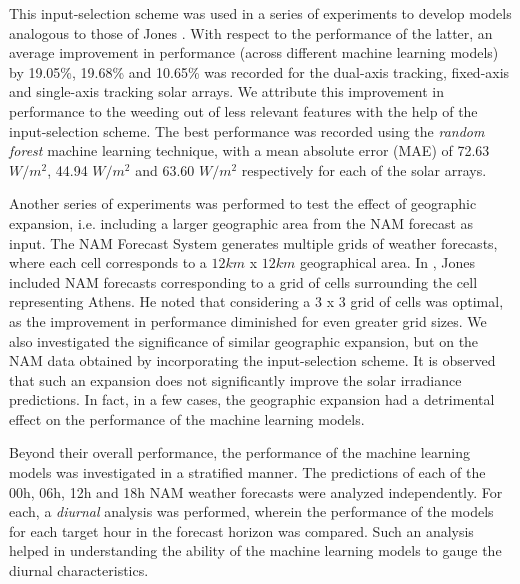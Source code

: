 \par This input-selection scheme was used in a series of experiments to develop models analogous to those of Jones \cite{thesis_zach}. With respect to the performance of the latter, an average improvement in performance (across different machine learning models) by 19.05\%, 19.68\% and 10.65\% was recorded for the dual-axis tracking, fixed-axis and single-axis tracking solar arrays. We attribute this improvement in performance to the weeding out of less relevant features with the help of the input-selection scheme. The best performance was recorded using the \textit{random forest} machine learning technique, with a mean absolute error (MAE) of 72.63 $W/m^2$, 44.94 $W/m^2$ and 63.60 $W/m^2$ respectively for each of the solar arrays. 

\par Another series of experiments was performed to test the effect of geographic expansion, i.e. including a larger geographic area from the NAM forecast as input. The NAM Forecast System generates multiple grids of weather forecasts, where each cell corresponds to a $12km$ x $12km$ geographical area. In \cite{thesis_zach}, Jones included NAM forecasts corresponding to a grid of cells surrounding the cell representing Athens. He noted that considering a $3$ x $3$ grid of cells was optimal, as the improvement in performance diminished for even greater grid sizes. We also investigated the significance of similar geographic expansion, but on the NAM data obtained by incorporating the input-selection scheme. It is observed that such an expansion does not significantly improve the solar irradiance predictions. In fact, in a few cases, the geographic expansion had a detrimental effect on the performance of the machine learning models.

\par Beyond their overall performance, the performance of the machine learning models was investigated in a stratified manner. The predictions of each of the 00h, 06h, 12h and 18h NAM weather forecasts were analyzed independently. For each, a \textit{diurnal} analysis was performed, wherein the performance of the models for each target hour in the forecast horizon was compared. Such an analysis helped in understanding the ability of the machine learning models to gauge the diurnal characteristics.

